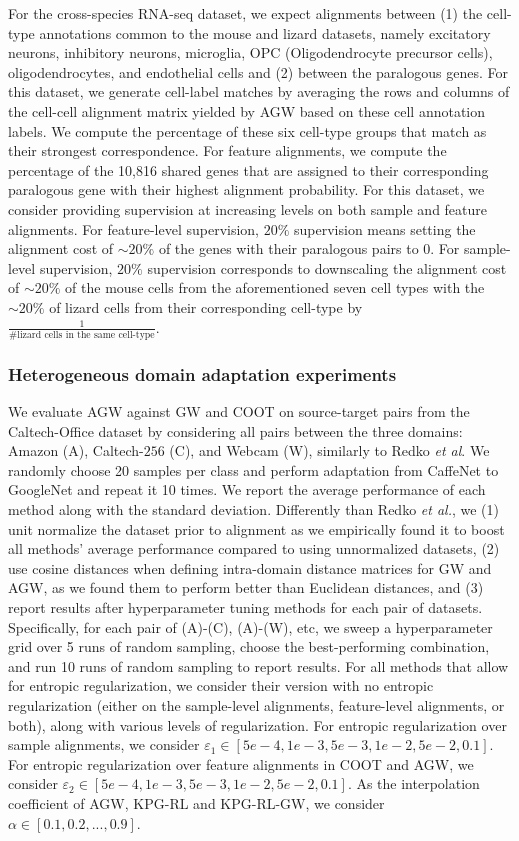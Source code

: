 For the cross-species RNA-seq dataset, we expect alignments between (1) the cell-type annotations
common to the mouse and lizard datasets, namely excitatory neurons, inhibitory neurons,
microglia, OPC (Oligodendrocyte precursor cells), oligodendrocytes, and endothelial cells
and (2) between the paralogous genes. For this dataset, we generate cell-label matches
by averaging the rows and columns of the cell-cell alignment matrix yielded by AGW based on
these cell annotation labels. We compute the percentage of these six cell-type groups that
match as their strongest correspondence. For feature alignments, we compute the percentage
of the 10,816 shared genes that are assigned to their corresponding paralogous gene with
their highest alignment probability. For this dataset, we consider providing supervision at
increasing levels on both sample and feature alignments. For feature-level supervision,
$20\%$ supervision means setting the alignment cost of $\sim 20\%$ of the genes with
their paralogous pairs to $0$. For sample-level supervision, $20\%$ supervision corresponds
to downscaling the alignment cost of $\sim 20\%$ of the mouse cells from the aforementioned
seven cell types with the $\sim 20\%$ of lizard cells from their corresponding cell-type by
$\frac{1}{\textrm{\# lizard cells in the same cell-type}}$.

\subsubsection{Heterogeneous domain adaptation experiments}
We evaluate AGW against GW and COOT on source-target pairs from the Caltech-Office dataset
\citep{Saenko10}by considering all pairs between the three domains: Amazon (A), Caltech-$256$ (C),
and Webcam (W), similarly to Redko \textit{et al}. We randomly choose 20 samples per class
and perform adaptation from CaffeNet to GoogleNet and repeat it 10 times.
We report the average performance of each method along with the standard deviation.
Differently than Redko \textit{et al.}, we (1) unit normalize the dataset prior to alignment
as we empirically found it to boost all methods' average performance compared to using
unnormalized datasets, (2) use cosine distances when defining intra-domain distance matrices
for GW and AGW, as we found them to perform better than Euclidean distances,
and (3) report results after hyperparameter tuning methods for each pair of datasets.
Specifically, for each pair of (A)-(C), (A)-(W), etc, we sweep a hyperparameter grid over
5 runs of random sampling, choose the best-performing combination, and run
10 runs of random sampling to report results. For all methods that allow for entropic regularization,
we consider their version with no entropic regularization (either on the sample-level alignments,
feature-level alignments, or both), along with various levels of regularization.
For entropic regularization over sample alignments, we consider
$\varepsilon_1 \in [ 5e-4, 1e-3, 5e-3, 1e-2, 5e-2, 0.1] $.  For entropic regularization over
feature alignments in COOT and AGW, we consider $\varepsilon_2 \in [ 5e-4, 1e-3, 5e-3, 1e-2, 5e-2, 0.1]$.
As the interpolation coefficient of AGW, KPG-RL and KPG-RL-GW, we consider
$\alpha \in [ 0.1, 0.2, ..., 0.9]$.

